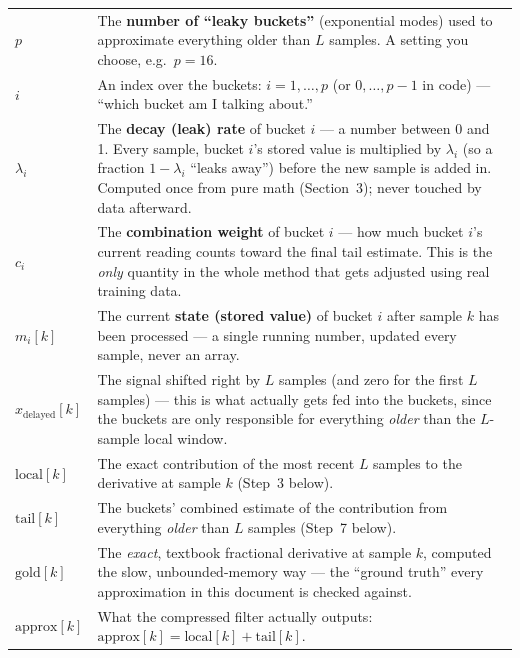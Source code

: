 \documentclass[11pt]{article}
\begin{document}
\begin{center}
\begin{tabularx}{\textwidth}{lX}
$p$ & The \textbf{number of ``leaky buckets''} (exponential modes) used to approximate everything older than $L$ samples. A setting you choose, e.g.\ $p=16$. \\
$i$ & An index over the buckets: $i=1,\dots,p$ (or $0,\dots,p-1$ in code) --- ``which bucket am I talking about.'' \\
$\lambda_i$ & The \textbf{decay (leak) rate} of bucket $i$ --- a number between 0 and 1. Every sample, bucket $i$'s stored value is multiplied by $\lambda_i$ (so a fraction $1-\lambda_i$ ``leaks away'') before the new sample is added in. Computed once from pure math (Section~3); never touched by data afterward. \\
$c_i$ & The \textbf{combination weight} of bucket $i$ --- how much bucket $i$'s current reading counts toward the final tail estimate. This is the \emph{only} quantity in the whole method that gets adjusted using real training data. \\
$m_i[k]$ & The current \textbf{state (stored value)} of bucket $i$ after sample $k$ has been processed --- a single running number, updated every sample, never an array. \\
$x_{\text{delayed}}[k]$ & The signal shifted right by $L$ samples (and zero for the first $L$ samples) --- this is what actually gets fed into the buckets, since the buckets are only responsible for everything \emph{older} than the $L$-sample local window. \\
$\text{local}[k]$ & The exact contribution of the most recent $L$ samples to the derivative at sample $k$ (Step~3 below). \\
$\text{tail}[k]$ & The buckets' combined estimate of the contribution from everything \emph{older} than $L$ samples (Step~7 below). \\
$\text{gold}[k]$ & The \emph{exact}, textbook fractional derivative at sample $k$, computed the slow, unbounded-memory way --- the ``ground truth'' every approximation in this document is checked against. \\
$\text{approx}[k]$ & What the compressed filter actually outputs: $\text{approx}[k] = \text{local}[k] + \text{tail}[k]$. \\
\bottomrule
\end{tabularx}
\end{center}
\end{document}
